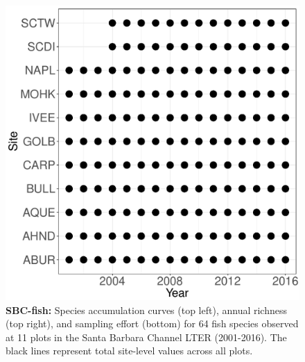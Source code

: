 \documentclass[11pt, oneside]{article}
\begin{document}
\begin{figure}[h!]
\includegraphics[scale = 0.4]{sbc-fish-castorani_spatiotemporal_sampling_effort.pdf}
\caption{{\bf SBC-fish:} Species accumulation curves (top left),  annual richness (top right), and sampling effort (bottom)  for 64 fish species observed at 11 plots in the Santa Barbara Channel LTER (2001-2016). The black lines represent total site-level values across all plots.}
\label{sbc-fish}
\end{figure}
\end{document}
